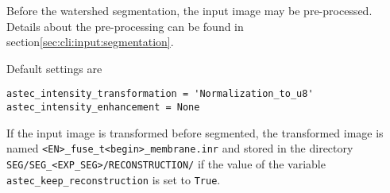 Before the watershed segmentation, the input image may be pre-processed. Details about the pre-processing can be found in section\ref{sec:cli:input:segmentation}.

Default settings are
\begin{verbatim}
astec_intensity_transformation = 'Normalization_to_u8'
astec_intensity_enhancement = None
\end{verbatim}

If the input image is transformed before segmented, the transformed image is named \texttt{<EN>\_fuse\_t<begin>\_membrane.inr} and stored in the directory \texttt{SEG/SEG\_<EXP\_SEG>/RECONSTRUCTION/} if the value of the variable \texttt{astec\_keep\_reconstruction} is set to \texttt{True}.

